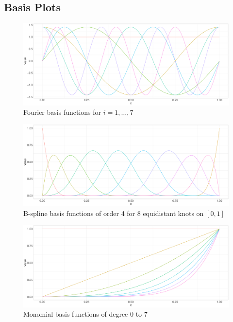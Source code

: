 \documentclass[11pt,twoside,a4paper]{article}
\begin{document}
	\newpage
	
	\subsection{Basis Plots}\label{Basis_Plots}
	
	\begin{figure}[H]\label{Fourier_basis}
		\includegraphics[width = \textwidth]{../Graphics/Fourier_Basis.pdf}
		\caption{Fourier basis functions for $i = 1,\dots,7$}
	\end{figure}
	
	\begin{figure}[H]\label{B-spline_basis}
		\includegraphics[width = \textwidth]{../Graphics/Bspline_Basis.pdf}
		\caption{B-spline basis functions of order 4 for 8 equidistant knots on $[0,1]$}
	\end{figure}

	\begin{figure}[H]\label{monomial_basis}
		\includegraphics[width = \textwidth]{../Graphics/Monomial_Basis.pdf}
		\caption{Monomial basis functions of degree 0 to 7}
	\end{figure}
\end{document}
